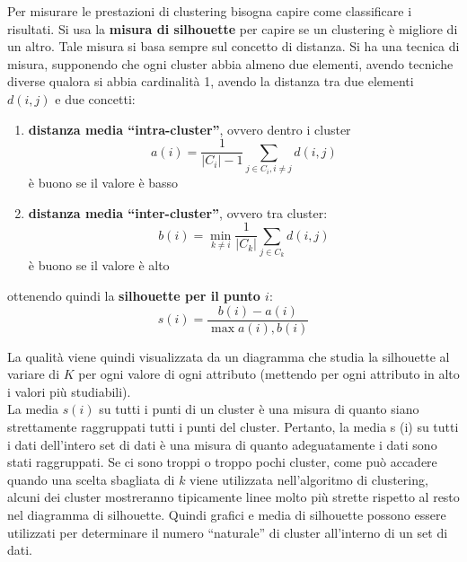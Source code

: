 \documentclass[a4paper,12pt, oneside]{book}
\begin{document}
Per misurare le prestazioni di clustering bisogna capire come classificare i
risultati. Si usa la \textbf{misura di silhouette} per capire se un clustering è
migliore di un altro. Tale misura si basa sempre sul concetto di distanza. Si
ha una tecnica di misura, supponendo che ogni cluster abbia almeno due
elementi, avendo tecniche diverse qualora si abbia cardinalità 1, avendo la
distanza tra due elementi $d(i,j)$ e due concetti:
\begin{enumerate}
  \item \textbf{distanza media ``intra-cluster''}, ovvero dentro i cluster
  \[a(i)=\frac{1}{|C_i|-1}\sum_{j\in C_i, i\neq j}d(i,j)\]
  è buono se il valore è basso
  \item \textbf{distanza media ``inter-cluster''}, ovvero tra cluster:
  \[b(i)=\min_{k\neq i}\frac{1}{|C_k|}\sum_{j\in C_k}d(i,j)\]
  è buono se il valore è alto
\end{enumerate}
ottenendo quindi la \textbf{silhouette per il punto $i$}:
\[s(i)=\frac{b(i)-a(i)}{\max{a(i),b(i)}}\]

La qualità viene quindi visualizzata da un diagramma che studia la silhouette al
variare di $K$ per ogni valore di ogni attributo (mettendo per ogni attributo in
alto i valori più studiabili).\\
La media $s(i)$ su tutti i punti di un cluster è una misura di quanto siano
strettamente raggruppati tutti i punti del cluster. Pertanto, la media s (i) su
tutti i dati dell'intero set di dati è una misura di quanto adeguatamente i dati
sono stati raggruppati. Se ci sono troppi o troppo pochi cluster, come può
accadere quando una scelta sbagliata di $k$ viene utilizzata nell'algoritmo di
clustering, alcuni dei cluster mostreranno tipicamente
linee molto più strette rispetto al resto nel diagramma di silhouette. Quindi
grafici e media di silhouette 
possono essere utilizzati per determinare il numero ``naturale'' di cluster
all'interno di un set di dati. 
\end{document}
